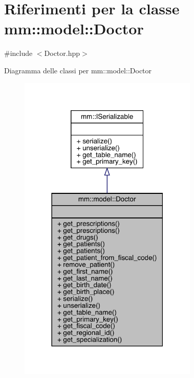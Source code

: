 \hypertarget{classmm_1_1model_1_1_doctor}{}\section{Riferimenti per la classe mm\+:\+:model\+:\+:Doctor}
\label{classmm_1_1model_1_1_doctor}


{\ttfamily \#include $<$Doctor.\+hpp$>$}



Diagramma delle classi per mm\+:\+:model\+:\+:Doctor\nopagebreak
\begin{figure}[H]
\begin{center}
\leavevmode
\includegraphics[width=242pt]{dd/d55/classmm_1_1model_1_1_doctor__inherit__graph}
\end{center}
\end{figure}


